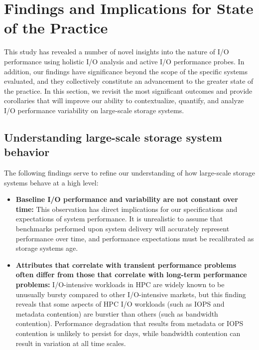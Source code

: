 \section{Findings and Implications for State of the Practice}
\label{sec:findings}


This study has revealed a number of novel insights into the nature of I/O performance using holistic I/O analysis and active I/O performance probes.
In addition, our findings have significance beyond the scope of the specific systems evaluated, and they collectively constitute an advancement to the greater state of the practice.
In this section, we revisit the most significant outcomes and provide corollaries that will improve our ability to contextualize, quantify, and analyze I/O performance variability on large-scale storage systems.

\subsection{Understanding large-scale storage system behavior}

The following findings serve to refine our understanding of how large-scale storage
systems behave at a high level: 

\begin{itemize}[leftmargin=*]

\item \textbf{Baseline I/O performance and variability are not constant over
time:} This observation has direct implications for our specifications and
expectations of system performance.  It is unrealistic to assume that
benchmarks performed upon system delivery will accurately represent
performance over time, and performance expectations must be recalibrated as storage systems age.

\item \textbf{Attributes that correlate with transient performance problems  often differ from those that correlate with
long-term performance problems:}  I/O-intensive workloads in HPC
are widely known to be unusually bursty compared to other I/O-intensive markets, but this finding reveals that some aspects of HPC I/O workloads (such as IOPS
and metadata contention) are burstier than others (such as bandwidth contention).  Performance degradation that results from metadata or IOPS contention is unlikely to persist for days, while bandwidth contention can result in variation at all time scales.

\end{itemize}



